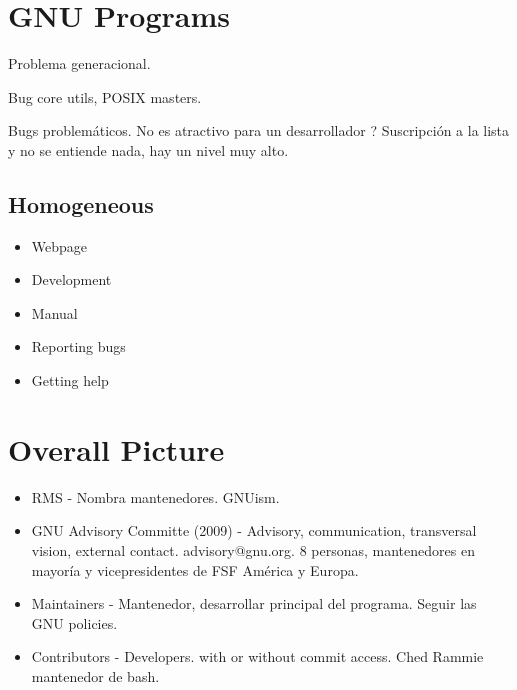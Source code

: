 \documentclass[11pt]{scrartcl}
\begin{document}
\section{GNU Programs}
\label{sec:gnu-programs}

\par Problema generacional.

\par Bug core utils, POSIX masters.

\par Bugs problem\'aticos. No es atractivo para un desarrollador ? Suscripci\'on a la lista y no se entiende nada, hay un nivel muy alto.


\subsection{Homogeneous}
\label{sub:homogeneous}

\begin{itemize}
	\item Webpage
	\item Development
	\item Manual
	\item Reporting bugs
	\item Getting help
\end{itemize}


\section{Overall Picture}
\label{sec:overall-pic}

\begin{itemize}
	\item RMS - Nombra mantenedores. GNUism.
	\item GNU Advisory Committe (2009) - Advisory, communication, transversal vision, external contact. advisory@gnu.org. 8 personas, mantenedores en mayor\'ia y vicepresidentes de FSF Am\'erica y Europa.
	\item Maintainers - Mantenedor, desarrollar principal del programa. Seguir las GNU policies.
	\item Contributors - Developers. with or without commit access. Ched Rammie mantenedor de bash.
\end{itemize}

\end{document}

